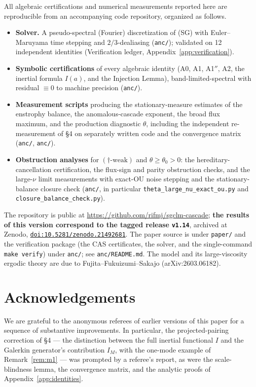 \documentclass[11pt]{article}
\theoremstyle{remark}
\theoremstyle{plain}
\begin{document}
All algebraic certifications and numerical measurements reported here are reproducible
from an accompanying code repository, organized as follows.
\begin{itemize}
\item \textbf{Solver.} A pseudo-spectral (Fourier) discretization of (SG) with
  Euler--Maruyama time stepping and $2/3$-dealiasing (\texttt{anc/}); validated
  on 12 independent identities (Verification ledger, Appendix~\ref{app:verification}).
\item \textbf{Symbolic certifications} of every algebraic identity (A0, A1, A1$''$, A2,
  the inertial formula $I(a)$, and the Injection Lemma), band-limited-spectral with
  residual $\equiv 0$ to machine precision (\texttt{anc/}).
\item \textbf{Measurement scripts} producing the stationary-measure estimates of the
  enstrophy balance, the anomalous-cascade exponent, the broad flux maximum, and the
  production diagnostic $\theta$, including the independent re-measurement of
  \S4 on separately written code and the convergence matrix
  (\texttt{anc/}, \texttt{anc/}).
\item \textbf{Obstruction analyses} for $(\dagger\text{-weak})$ and $\theta \ge \theta_0 > 0$:
  the hereditary-cancellation certification, the flux-sign and parity obstruction
  checks, and the large-$\nu$ limit measurements with exact-OU noise stepping and
  the stationary-balance closure check (\texttt{anc/}, in particular
  \texttt{theta\_large\_nu\_exact\_ou.py} and \texttt{closure\_balance\_check.py}).
\end{itemize}
The repository is public at \url{https://github.com/rifmj/sgclm-cascade}; \textbf{the
results of this version correspond to the tagged release \texttt{v1.14}}, archived at Zenodo,
\href{https://doi.org/10.5281/zenodo.21492681}{\texttt{doi:10.5281/zenodo.21492681}}. The
paper source is under \texttt{paper/} and the verification package (the CAS certificates, the
solver, and the single-command \texttt{make verify}) under \texttt{anc/}; see \texttt{anc/README.md}.
The model and its
large-viscosity ergodic theory are due to Fujita--Fukuizumi--Sakajo (arXiv:2603.06182).

\section*{Acknowledgements}

We are grateful to the anonymous referees of earlier versions of this paper for a
sequence of substantive improvements. In particular, the projected-pairing correction of
\S4 --- the distinction between the full inertial functional $I$ and the Galerkin
generator's contribution $I_M$, with the one-mode example of Remark~\ref{rem:m1} --- was
prompted by a referee's report, as were the scale-blindness lemma, the convergence
matrix, and the analytic proofs of Appendix~\ref{app:identities}.
\end{document}
